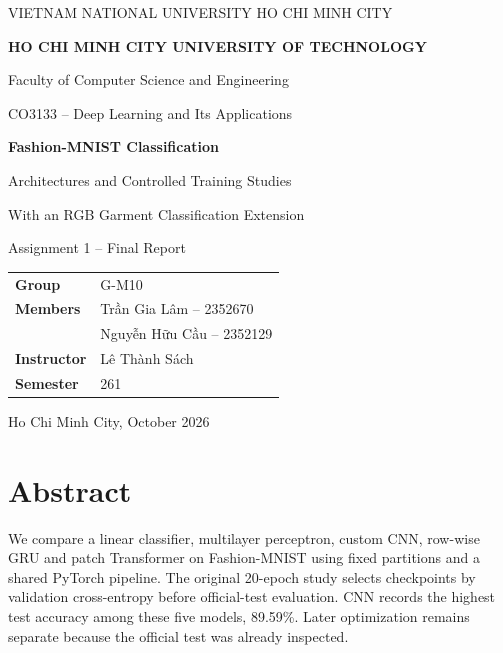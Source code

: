 \setcounter{tocdepth}{1}
\captionsetup{font=small,labelfont=bf}
\pagestyle{fancy}
\fancyhf{}
\fancyfoot[C]{\thepage}
\renewcommand{\headrulewidth}{0.3pt}
\setlength{\headheight}{14pt}

\begin{titlepage}
\centering
{\large VIETNAM NATIONAL UNIVERSITY HO CHI MINH CITY\par}
\vspace{4mm}
{\Large\bfseries HO CHI MINH CITY UNIVERSITY OF TECHNOLOGY\par}
\vspace{3mm}
{\large Faculty of Computer Science and Engineering\par}
\vspace{21mm}
{\large CO3133 -- Deep Learning and Its Applications\par}
\vspace{7mm}
{\Huge\bfseries Fashion-MNIST Classification\par}
\vspace{7mm}
{\LARGE Architectures and Controlled Training Studies\par}
\vspace{4mm}
{\large With an RGB Garment Classification Extension\par}
\vspace{12mm}
{\Large Assignment 1 -- Final Report\par}
\vspace{15mm}
\begin{tabular}{ll}
\textbf{Group} & G-M10 \\
\textbf{Members} & Trần Gia Lâm -- 2352670 \\
 & Nguyễn Hữu Cầu -- 2352129 \\
\textbf{Instructor} & Lê Thành Sách \\
\textbf{Semester} & 261 \\
\end{tabular}
\vfill
{\large Ho Chi Minh City, October 2026\par}
\end{titlepage}

\section*{Abstract}
We compare a linear classifier, multilayer perceptron, custom CNN, row-wise GRU and patch Transformer on Fashion-MNIST using fixed partitions and a shared PyTorch pipeline. The original 20-epoch study selects checkpoints by validation cross-entropy before official-test evaluation. CNN records the highest test accuracy among these five models, 89.59\%. Later optimization remains separate because the official test was already inspected.

